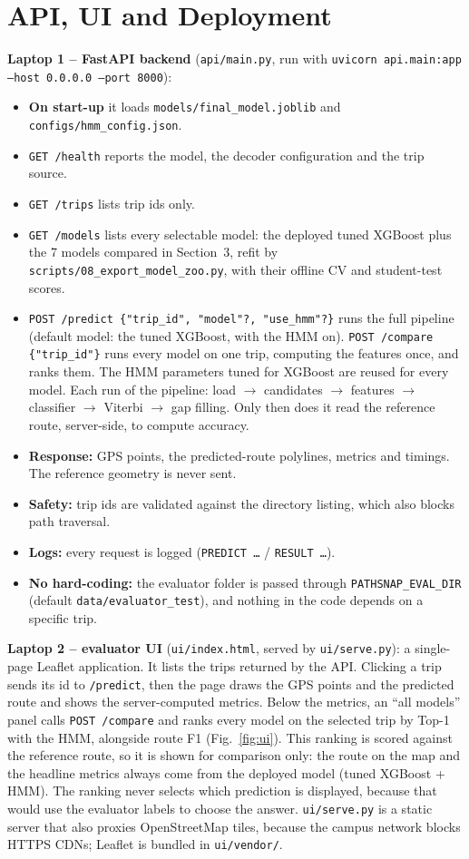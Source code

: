 \documentclass[10pt,a4paper]{article}
\newcommand{\code}[1]{\texttt{\small #1}}
\begin{document}
\section{API, UI and Deployment}
\textbf{Laptop 1 -- FastAPI backend} (\code{api/main.py}, run with \code{uvicorn api.main:app --host 0.0.0.0 --port 8000}):
\begin{itemize}
  \item \textbf{On start-up} it loads \code{models/final\_model.joblib} and \code{configs/hmm\_config.json}.
  \item \code{GET /health} reports the model, the decoder configuration and the trip source.
  \item \code{GET /trips} lists trip ids only.
  \item \code{GET /models} lists every selectable model: the deployed tuned XGBoost plus the 7 models compared in Section~3, refit by \code{scripts/08\_export\_model\_zoo.py}, with their offline CV and student-test scores.
  \item \code{POST /predict \{"trip\_id", "model"?, "use\_hmm"?\}} runs the full pipeline (default model: the tuned XGBoost, with the HMM on). \code{POST /compare \{"trip\_id"\}} runs every model on one trip, computing the features once, and ranks them. The HMM parameters tuned for XGBoost are reused for every model. Each run of the pipeline: load $\rightarrow$ candidates $\rightarrow$ features $\rightarrow$ classifier $\rightarrow$ Viterbi $\rightarrow$ gap filling. Only then does it read the reference route, server-side, to compute accuracy.
  \item \textbf{Response:} GPS points, the predicted-route polylines, metrics and timings. The reference geometry is never sent.
  \item \textbf{Safety:} trip ids are validated against the directory listing, which also blocks path traversal.
  \item \textbf{Logs:} every request is logged (\code{PREDICT \dots} / \code{RESULT \dots}).
  \item \textbf{No hard-coding:} the evaluator folder is passed through \code{PATHSNAP\_EVAL\_DIR} (default \code{data/evaluator\_test}), and nothing in the code depends on a specific trip.
\end{itemize}

\textbf{Laptop 2 -- evaluator UI} (\code{ui/index.html}, served by \code{ui/serve.py}): a single-page Leaflet application. It lists the trips returned by the API. Clicking a trip sends its id to \code{/predict}, then the page draws the GPS points and the predicted route and shows the server-computed metrics. Below the metrics, an ``all models'' panel calls \code{POST /compare} and ranks every model on the selected trip by Top-1 with the HMM, alongside route F1 (Fig.~\ref{fig:ui}). This ranking is scored against the reference route, so it is shown for comparison only: the route on the map and the headline metrics always come from the deployed model (tuned XGBoost + HMM). The ranking never selects which prediction is displayed, because that would use the evaluator labels to choose the answer. \code{ui/serve.py} is a static server that also proxies OpenStreetMap tiles, because the campus network blocks HTTPS CDNs; Leaflet is bundled in \code{ui/vendor/}.
\end{document}
